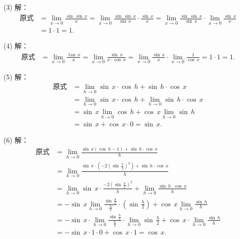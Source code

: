 \noindent (3) 解：
\begin{align}
    \text{原式} &= \lim_{x \to 0} \frac{\sin \, \sin \, x}{x} = \lim_{x \to 0} \frac{\sin \, \sin \, x}{\sin \, x} \cdot \frac{\sin \, x}{x} = \lim_{x \to 0} \frac{\sin \, \sin \, x}{\sin \, x} \cdot \lim_{x \to 0} \frac{\sin \, x}{x} \\
    &= 1 \cdot 1 = 1.
\end{align}

\noindent (4) 解：
\begin{align}
    \text{原式} &= \lim_{x \to 0} \frac{\tan \, x}{x} = \lim_{x \to 0} \frac{\sin \, x}{x \cdot \cos \, x} = \lim_{x \to 0} \frac{\sin \, x}{x} \cdot \lim_{x \to 0} \frac{1}{\cos \, x} = 1 \cdot 1 = 1.
\end{align}

\noindent (5) 解：
\begin{align}
    \text{原式} &= \lim_{h \to 0} \sin \, x \cdot \cos \, h + \sin \, h \cdot \cos \, x \\
    &= \lim_{h \to 0} \sin \, x \cdot \cos \, h + \lim_{h \to 0} \sin \, h \cdot \cos \, x \\
    &= \sin \, x \lim_{h \to 0} \cos \, h + \cos \, x \lim_{h \to 0} \sin \, h \\
    &= \sin \, x + \cos \, x \cdot 0 = \sin \, x.
\end{align}

\noindent (6) 解：
\begin{align}
    \text{原式} &= \lim_{h \to 0} \frac{\sin \, x \left(\cos \, h - 1\right) + \sin \, h \cdot \cos \, x}{h} \\
    &= \lim_{h \to 0} \frac{\sin \, x \cdot \left(-2 (\sin \, \displaystyle\frac{h}{2} )^2 \right) + \sin \, h \cdot \cos \, x}{h} \\
    &= \lim_{h \to 0} \sin \, x \cdot \frac{-2 \left(\sin \, \displaystyle\frac{h}{2}\right)^2}{h} + \lim_{h \to 0} \frac{\sin \, h \cdot \cos \, x}{h} \\
    &= - \sin \, x \lim_{h \to 0} \frac{\sin \, \displaystyle\frac{h}{2}}{\displaystyle\frac{h}{2}} \cdot \left(\sin \, \displaystyle\frac{h}{2}\right) + \cos \, x \lim_{h \to 0} \frac{\sin \, h}{h} \\
    &= - \sin \, x \cdot \lim_{h \to 0} \displaystyle\frac{\sin \, \displaystyle\frac{h}{2}}{\displaystyle\frac{h}{2}} \cdot \lim_{h \to 0} \sin \, \displaystyle\frac{h}{2} + \cos \, x \cdot \lim_{h \to 0} \displaystyle\frac{\sin \, h}{h} \\
    &= - \sin \, x \cdot 1 \cdot 0 + \cos \, x \cdot 1 = \cos \, x.
\end{align}

